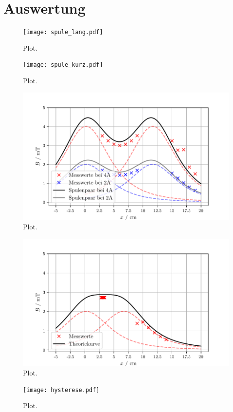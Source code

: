 \section{Auswertung}
\label{sec:Auswertung}

\begin{figure}
  \centering
  \texttt{[image: spule\_lang.pdf]}
  \caption{Plot.}
  \label{fig:plot}
\end{figure}

\begin{figure}
  \centering
  \texttt{[image: spule\_kurz.pdf]}
  \caption{Plot.}
  \label{fig:plot}
\end{figure}

\begin{figure}
  \centering
  \includegraphics{helmholtzD.pdf}
  \caption{Plot.}
  \label{fig:plot}
\end{figure}

\begin{figure}
  \centering
  \includegraphics{helmholtzR.pdf}
  \caption{Plot.}
  \label{fig:plot}
\end{figure}

\begin{figure}
  \centering
  \texttt{[image: hysterese.pdf]}
  \caption{Plot.}
  \label{fig:plot}
\end{figure}
